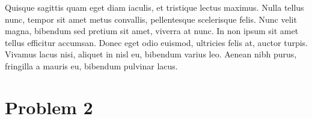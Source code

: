 \documentclass[a4paper,11pt]{article}
\begin{document}
Quisque sagittis quam eget diam iaculis, et tristique lectus maximus.
Nulla tellus nunc, tempor sit amet metus convallis, pellentesque
scelerisque felis. Nunc velit magna, bibendum sed pretium sit amet,
viverra at nunc. In non ipsum sit amet tellus efficitur accumsan. Donec
eget odio euismod, ultricies felis at, auctor turpis. Vivamus lacus
nisi, aliquet in nisl eu, bibendum varius leo. Aenean nibh purus,
fringilla a mauris eu, bibendum pulvinar lacus.



\section*{Problem 2}

\printbibliography
\end{document}
